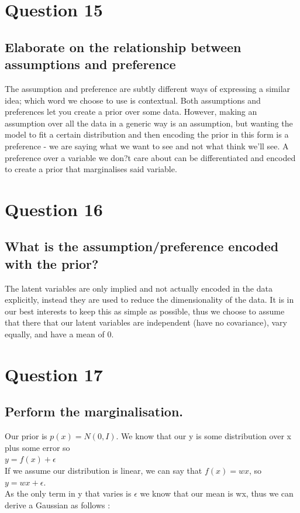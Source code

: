 \documentclass[a4paper, 9pt]{article}
\begin{document}
\section*{Question 15}
\subsection*{Elaborate on the relationship between assumptions and preference}
The assumption and preference are subtly different ways of expressing a similar idea; which word we choose to use is contextual. Both assumptions and preferences let you create a prior over some data. However, making an assumption over all the data in a generic way is an assumption, but wanting the model to fit a certain distribution and then encoding the prior in this form is a preference - we are saying what we want to see and not what think we'll see. A preference over a variable we don?t care about can be differentiated and encoded to create a prior that marginalises said variable. 

\section*{Question 16}
\subsection*{What is the assumption/preference encoded with the prior?}
The latent variables are only implied and not actually encoded in the data explicitly, instead they are used to reduce the dimensionality of the data. It is in our best interests to keep this as simple as possible, thus we choose to assume that there that our latent variables are independent (have no covariance), vary equally, and have a mean of 0.

\section*{Question 17}
\subsection*{Perform the marginalisation.}
Our prior is \( p(x) = N (0, I) \). We know that our y is some distribution over x plus some error so \\

 \( y = f(x) + \epsilon \) \\
 
 If we assume our distribution is linear, we can say that \( f(x) = wx \), so \( y = wx + \epsilon \). \\
As the only term in y that varies is \( \epsilon \) we know that our mean is wx, thus we can derive a Gaussian as follows : \\
\end{document}
